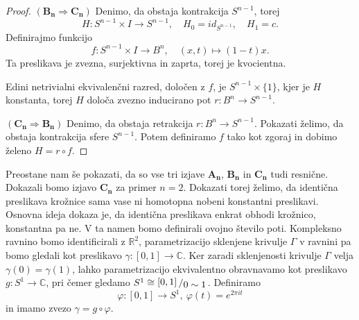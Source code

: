 \documentclass[10pt, a4paper]{article}
\newenvironment{noticeC}{%
  \tcolorbox[%
  notitle,
  empty,
  enhanced,  %
  breakable,
  coltext=black, 
  fontupper=\rmfamily,
  parbox=false,
  noparskip,
  sharp corners,
  boxrule=-1pt,  %
  frame hidden,
  left=7pt,  %
  right=7pt,
  top=5pt,
  bottom=5pt,
  before skip=2.5ex plus 2pt,
  after skip=2.5ex plus 2pt,
  overlay unbroken and last={%
  },
  ]}
{\endtcolorbox}
\newenvironment{dokaz}%
  {\begin{noticeC}\begin{proof}}%
  {\end{proof}\end{noticeC}}
\newcommand{\R}{\mathbb {R}}
\newcommand{\C}{\mathbb {C}}
\newcommand{\quot}[2]{{\raisebox{0.1em}{$#1$}\left/\raisebox{-0.2em}{$#2$}\right.}}
\begin{document}
\begin{dokaz}
  $(\mathbf{B_n} \Rightarrow \mathbf{C_n})$ Denimo, da obstaja kontrakcija $S^{n - 1}$,
  torej $$H : S^{n - 1} \times I \to S^{n - 1},\quad H_0 = id_{S^{n -1}},\quad H_1 = c.$$
  Definirajmo funkcijo 
  $$f: S^{n - 1} \times I \to B^n,\quad (x, t) \mapsto (1-t)x.$$
  Ta preslikava je zvezna, surjektivna in zaprta, torej je kvocientna.
  \begin{center}
  \end{center}  
  Edini netrivialni ekvivalenčni razred, določen z $f$, je $S^{n -1} \times \{1\}$, kjer je $H$ 
  konstanta, torej $H$ določa zvezno inducirano pot $r: B^n \to S^{n -1}$.
  \begin{center}
  \end{center} 
  $(\mathbf{C_n} \Rightarrow \mathbf{B_n})$ Denimo, da obstaja retrakcija $r: B^n \to S^{n - 1}$.
  Pokazati želimo, da obstaja kontrakcija sfere $S^{n - 1}$. Potem definiramo $f$ tako kot zgoraj 
  in dobimo želeno $H = r \circ f$.
\end{dokaz}

Preostane nam še pokazati, da so vse tri izjave $\mathbf{A_n}$, $\mathbf{B_n}$ in $\mathbf{C_n}$ tudi resnične.
Dokazali bomo izjavo $\mathbf{C_n}$ za primer $n = 2$.
Dokazati torej želimo, da identična preslikava krožnice sama vase ni 
homotopna nobeni konstantni preslikavi. Osnovna ideja dokaza je, da 
identična preslikava enkrat obhodi krožnico, konstantna pa ne.
V ta namen bomo definirali ovojno število poti. Kompleksno ravnino bomo identificirali 
z $\R^2$, parametrizacijo sklenjene krivulje $\Gamma$ v ravnini 
pa bomo gledali kot preslikavo $\gamma : [0, 1] \to \C$.
Ker zaradi sklenjenosti krivulje $\Gamma$ velja $\gamma(0) = \gamma (1)$, lahko parametrizacijo 
ekvivalentno obravnavamo kot preslikavo $g: S^1 \to \C$, pri čemer gledamo $S^1 \cong \quot{[0, 1]}{0 \sim 1}$.
Definiramo $$\varphi: [0, 1] \to S^1,\ \varphi(t) = e^{2 \pi i t}$$
in imamo zvezo $\gamma = g \circ \varphi$.
\end{document}
